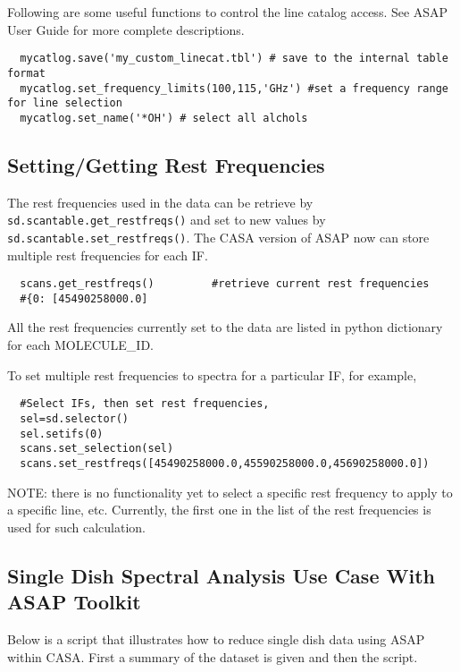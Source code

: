 Following are some useful functions to control the line catalog
access. See ASAP User Guide for more complete descriptions.

\small
\begin{verbatim}
  mycatlog.save('my_custom_linecat.tbl') # save to the internal table format
  mycatlog.set_frequency_limits(100,115,'GHz') #set a frequency range for line selection
  mycatlog.set_name('*OH') # select all alchols
\end{verbatim}
\normalsize


\subsection{Setting/Getting Rest Frequencies}
\label{subsection:sd.asap.restfreqs}

The rest frequencies used in the data can be retrieve by 
{\tt sd.scantable.get\_restfreqs()} and set to new values by 
{\tt sd.scantable.set\_restfreqs()}.
The CASA version of ASAP now can store multiple rest frequencies 
for each IF.

\small
\begin{verbatim}
  scans.get_restfreqs()         #retrieve current rest frequencies
  #{0: [45490258000.0]
\end{verbatim}
All the rest frequencies currently set to the data are listed in
python dictionary for each MOLECULE\_ID.

To set multiple rest frequencies to spectra for a particular IF,
for example, 
\begin{verbatim}
  #Select IFs, then set rest frequencies,
  sel=sd.selector()
  sel.setifs(0)
  scans.set_selection(sel)
  scans.set_restfreqs([45490258000.0,45590258000.0,45690258000.0])
\end{verbatim}

NOTE: there is no functionality yet to select a specific rest frequency 
to apply to a specific line, etc. Currently, the first one in the list
of the rest frequencies is used for such calculation.

 
\subsection{Single Dish Spectral Analysis Use Case With ASAP Toolkit}
\label{subsection:sd.asap.usecase}

Below is a script that illustrates how to reduce single dish data
using ASAP within CASA.  First a summary of the dataset is given and
then the script.

